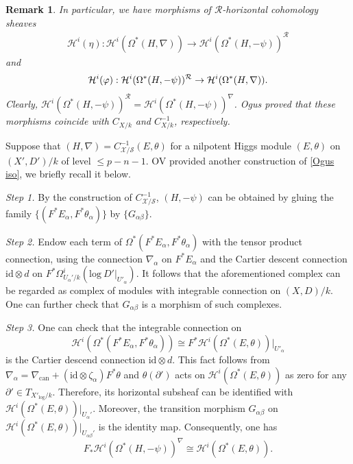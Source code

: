 \documentclass[12pt, a4paper]{article}
\newtheorem{remark}{Remark}[section]
\begin{document}
\begin{remark}
In particular, we have morphisms of $\mathcal R$-horizontal cohomology sheaves
\begin{eqnarray}\label{coordinate C}
\mathcal H^i(\eta):\mathcal H^i(\Omega^*(H,\nabla))\to\mathcal H^i(\Omega^*(H,-\psi))^\mathcal{R}
\end{eqnarray}
and
\begin{eqnarray}\label{coordinate C^{-1}}
\mathcal H^i(\varphi):\mathcal H^i(\Omega^*(H,-\psi))^\mathcal{R}\to\mathcal H^i(\Omega^*(H,\nabla)).
\end{eqnarray}
Clearly, $\mathcal H^i(\Omega^*(H,-\psi))^\mathcal{R}=\mathcal H^i(\Omega^*(H,-\psi))^\nabla$. Ogus proved that these morphisms coincide with $C_{X/k}$ and $C^{-1}_{X/k}$, respectively.
\end{remark}
Suppose that $(H,\nabla)=C^{-1}_{\mathcal X/\mathcal S}(E,\theta)$ for a nilpotent Higgs module $(E,\theta)$ on $(X',D')/k$ of level $\leq p-n-1$. OV provided another construction of \eqref{Ogus iso}, we briefly recall it below. 

{\itshape Step 1.} By the construction of $C^{-1}_{\mathcal X/\mathcal S}$, $(H,-\psi)$ can be obtained by gluing the family $\{(F^*E_\alpha,F^*\theta_\alpha)\}$ by $\{G_{\alpha\beta}\}$. 

{\itshape Step 2.} Endow each term of $\Omega^*(F^*E_\alpha,F^*\theta_\alpha)$ with the tensor product connection, using the connection $\nabla_\alpha$ on $F^*E_\alpha$ and the Cartier descent connection $\mathrm{id}\otimes d$ on $F^*\Omega^i_{U_\alpha'/k}(\mathrm{log}~D'|_{U'_\alpha})$.  It follows that the aforementioned complex can be regarded as complex of modules with integrable connection on $(X,D)/k$. One can further check that $G_{\alpha\beta}$ is a morphism of such complexes. 

{\itshape Step 3.} One can check that the integrable connection on
$$
\mathcal H^i(\Omega^*(F^*E_\alpha,F^*\theta_\alpha))\cong F^*\mathcal H^i(\Omega^*(E,\theta))|_{U'_\alpha}
$$ 
is the Cartier descend connection $\mathrm{id}\otimes d$. This fact follows from $\nabla_\alpha=\nabla_\mathrm{can}+(\mathrm{id}\otimes\zeta_\alpha)F^*\theta$ and $\theta(\partial')$ acts on $\mathcal H^i(\Omega^*(E,\theta))$ as zero for any $\partial'\in T_{X'_{\log}/k}$.
Therefore, its horizontal subsheaf
can be identified with $\mathcal H^i(\Omega^*(E,\theta))|_{U_\alpha'}$. Moreover, the transition morphism $G_{\alpha\beta}$ on $\mathcal H^i(\Omega^*(E,\theta))|_{U_{\alpha\beta}'}$ is the identity map.  Consequently, one has
$$
F_*\mathcal H^i(\Omega^*(H,-\psi))^\nabla\cong\mathcal H^i(\Omega^*(E,\theta)).
$$
\end{document}
